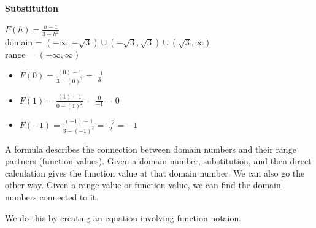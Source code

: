 \documentclass{ximera}
\begin{document}
\begin{procedure}   \textbf{\textcolor{purple!30!blue}{Substitution}}      

$F(h) = \frac{h-1}{3-h^2}$ \\
domain = $(-\infty, -\sqrt{3}) \cup (-\sqrt{3}, \sqrt{3}) \cup (\sqrt{3}, \infty)$ \\
range = $(-\infty, \infty)$


\begin{itemize}
\item $F(0) = \frac{(0) - 1}{3 - (0)^2} = \frac{-1}{3}$
\item $F(1) = \frac{(1) - 1}{0 - (1)^2} = \frac{0}{-1} = 0$
\item $F(-1) = \frac{(-1) - 1}{3 - (-1)^2} = \frac{-2}{2} = -1$
\end{itemize}

\end{procedure}



A formula describes the connection between domain numbers and their range partners (function values).  Given a domain number, substitution, and then direct calculation gives the function value at that domain number.  We can also go the other way.  Given a range value or function value, we can find the domain numbers connected to it.

We do this by creating an equation involving function notaion.
\end{document}
